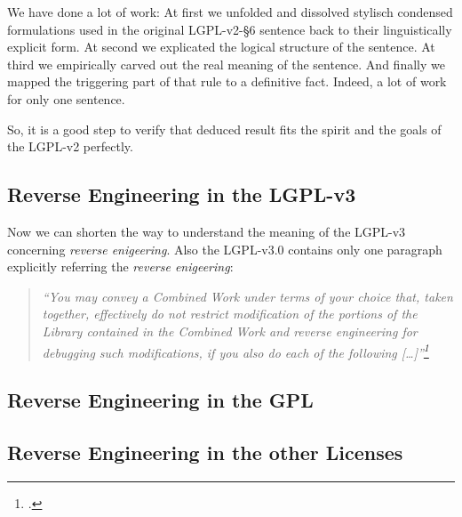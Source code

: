 We have done a lot of work: At first we unfolded and dissolved stylisch
condensed formulations used in the original LGPL-v2-§6 sentence back to their
linguistically explicit form. At second we explicated the logical structure of
the sentence. At third we empirically carved out the real meaning of the
sentence. And finally we mapped the triggering part of that rule to a definitive
fact. Indeed, a lot of work for only one sentence.

So, it is a good step to verify that deduced result fits the spirit and the
goals of the LGPL-v2 perfectly.


\subsection{Reverse Engineering in the LGPL-v3}

Now we can shorten the way to understand the meaning of the LGPL-v3 concerning
\emph{reverse enigeering}. Also the LGPL-v3.0 contains only one paragraph
explicitly referring the \emph{reverse enigeering}:


\begin{quote}\emph{
\enquote{You may convey a Combined Work under terms of your choice that,
taken together, effectively \emph{do not restrict} modification of the portions
of the Library contained in the Combined Work and \emph{reverse engineering} for
debugging such modifications, if you also do each of the following
[\ldots]}\footcite[cf.][\nopage wp]{Lgpl30OsiLicense2007a}}
\end{quote}


\subsection{Reverse Engineering in the GPL}

\subsection{Reverse Engineering in the other Licenses}













%
